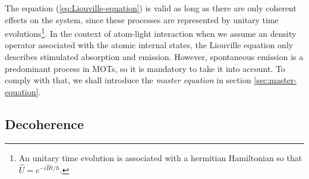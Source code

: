 The equation (\ref{eq:Liouville-equation}) is valid as long as there are only coherent effects on the system,  since these processes are represented by unitary time evolutions\footnote{An unitary time evolution is associated with a hermitian Hamiltonian so that $ \hat{U} = e^{-i \hat{H}t / \hbar} $.}. In the context of atom-light interaction when we assume an density operator associated with the atomic internal states, the Liouville equation only describes stimulated absorption and emission. However, spontaneous emission is a predominant process in MOTs, so it is mandatory to take it into account. To comply with that, we shall introduce the \textit{master equation} in section \ref{sec:master-equation}.

%
\subsection{Decoherence}
\label{sec:master-equation-decoherence}
%

